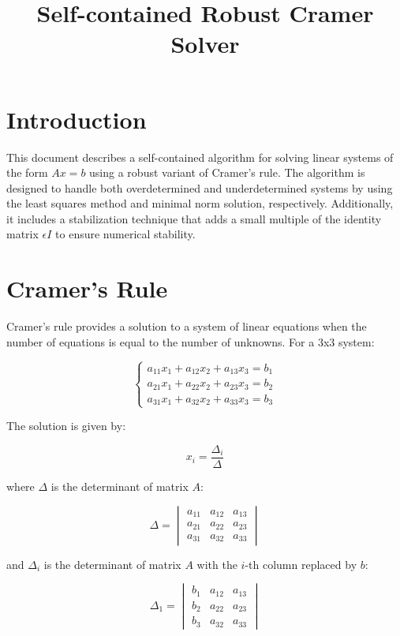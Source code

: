 \documentclass{article}
\title{Self-contained Robust Cramer Solver}
\author{}
\date{}
\begin{document}
\maketitle

\section{Introduction}
This document describes a self-contained algorithm for solving linear systems of the form \(Ax = b\) using a robust variant of Cramer's rule. The algorithm is designed to handle both overdetermined and underdetermined systems by using the least squares method and minimal norm solution, respectively. Additionally, it includes a stabilization technique that adds a small multiple of the identity matrix \(\epsilon I\) to ensure numerical stability.

\section{Cramer's Rule}
Cramer's rule provides a solution to a system of linear equations when the number of equations is equal to the number of unknowns. For a 3x3 system:

\[
\begin{cases}
a_{11}x_1 + a_{12}x_2 + a_{13}x_3 = b_1 \\
a_{21}x_1 + a_{22}x_2 + a_{23}x_3 = b_2 \\
a_{31}x_1 + a_{32}x_2 + a_{33}x_3 = b_3
\end{cases}
\]

The solution is given by:

\[
x_i = \frac{\Delta_i}{\Delta}
\]

where \(\Delta\) is the determinant of matrix \(A\):

\[
\Delta = \begin{vmatrix}
a_{11} & a_{12} & a_{13} \\
a_{21} & a_{22} & a_{23} \\
a_{31} & a_{32} & a_{33}
\end{vmatrix}
\]

and \(\Delta_i\) is the determinant of matrix \(A\) with the \(i\)-th column replaced by \(b\):

\[
\Delta_1 = \begin{vmatrix}
b_1 & a_{12} & a_{13} \\
b_2 & a_{22} & a_{23} \\
b_3 & a_{32} & a_{33}
\end{vmatrix}
\]
\end{document}
